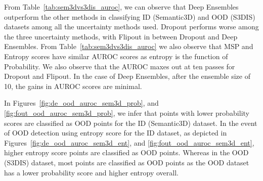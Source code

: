     From Table~\ref{tab:sem3dvs3dis_auroc}, we can observe that Deep Ensembles outperform the other methods in classifying ID (Semantic3D) and OOD (S3DIS) datasets among all the uncertainty methods used.
    Dropout performs worse among the three uncertainty methods, with Flipout in between Dropout and Deep Ensembles.
    From Table~\ref{tab:sem3dvs3dis_auroc} we also observe that MSP and Entropy scores have similar AUROC scores as entropy is the function of Probability.
    We also observe that the AUROC maxes out at ten passes for Dropout and Flipout.
    In the case of Deep Ensembles, after the ensemble size of 10, the gains in AUROC scores are minimal.

    In Figures~\ref{fig:de_ood_auroc_sem3d_prob}, and \ref{fig:fout_ood_auroc_sem3d_prob}, we infer that points with lower probability scores are classified as OOD points for the ID (Semantic3D) dataset.
    In the event of OOD detection using entropy score for the ID dataset, as depicted in Figures~\ref{fig:de_ood_auroc_sem3d_ent}, and \ref{fig:fout_ood_auroc_sem3d_ent}, higher entropy score points are classified as OOD points.
    Whereas in the OOD (S3DIS) dataset, most points are classified as OOD points as the OOD dataset has a lower probability score and higher entropy overall.
